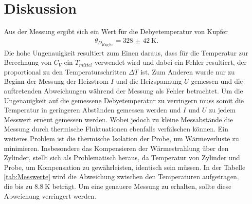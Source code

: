 \section{Diskussion}
\label{sec:Diskussion}

Aus der Messung ergibt sich ein Wert für die Debyetemperatur von Kupfer
\begin{align}
\theta_{D_{Kupfer}} = \SI{328(42)}{\kelvin}.
\end{align}
Die hohe Ungenauigkeit resultiert zum Einen daraus, dass für die Temperatur zur Berechnung von
$C_V$ ein $T_{mittel}$ verwendet wird und dabei ein Fehler resultiert, der proportional
zu den Temperaturschritten $\Delta T$ ist. Zum Anderen wurde
nur zu Beginn der Messung der Heizstrom $I$ und die Heizspannung $U$
gemessen und die auftretenden Abweichungen während der Messung als Fehler betrachtet.
Um die Ungenauigkeit auf die gemessene Debyetemperatur zu verringern muss somit die
Temperatur in geringeren Abständen gemessen werden und $I$ und $U$ zu jedem
Messwert erneut gemessen werden. Wobei jedoch zu kleine
Messabstände die Messung durch thermische Fluktuationen ebenfalls verfälschen können.
Ein weiteres Problem ist die thermische Isolation der Probe, um Wärmeverluste zu minimieren. Insbesondere das Kompensieren der Wärmestrahlung über
den Zylinder, stellt sich als Problematisch heraus, da Temperatur von Zylinder und Probe, um Kompensation zu gewährleisten, identisch sein müssen.
In der Tabelle \ref{tab:Messwerte} wird die Abweichung zwischen den Temperaturen aufgetragen, die bis zu $\SI{8.8}{\kelvin}$
beträgt. Um eine genauere Messung zu erhalten, sollte diese Abweichung verringert werden.

